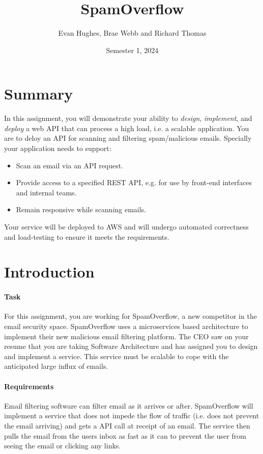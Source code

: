 \documentclass{csse4400}
\title{SpamOverflow}
\author{Evan Hughes, Brae Webb and Richard Thomas}
\date{Semester 1, 2024}
\begin{document}

\maketitle


\section*{Summary}
In this assignment, you will demonstrate your ability to \textsl{design},
\textsl{implement}, and \textsl{deploy} a web API that can process a high load,
i.e. a scalable application.
You are to deloy an API for scanning and filtering spam/malicious emails.
Specially your application needs to support:
\begin{itemize}
    \item Scan an email via an API request.
    \item Provide access to a specified REST API, e.g. for use by front-end interfaces and internal teams.
    \item Remain responsive while scanning emails.
\end{itemize}

Your service will be deployed to AWS and will undergo automated correctness and load-testing to ensure it meets the requirements.

\section{Introduction}

\paragraph{Task}
For this assignment, you are working for SpamOverflow, a new competitor in the email security space. SpamOverflow uses a microservices based architecture to implement their new malicious email filtering platform. The CEO saw on your resume that you are taking Software Architecture and has assigned you to design and implement a service. This service must be scalable to cope with the anticipated large influx of emails.

\paragraph{Requirements}
Email filtering software can filter email as it arrives or after. SpamOverflow will implement a service that does not impede the flow of traffic (i.e. does not prevent the email arriving) and gets a API call at receipt of an email. The service then pulls the email from the users inbox as fast as it can to prevent the user from seeing the email or clicking any links.
\end{document}
